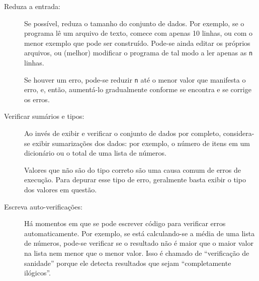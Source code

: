 \begin{description}

\item[Reduza a entrada:] Se possível, reduza o tamanho do conjunto de dados.
Por exemplo, se o programa lê um arquivo de texto, comece com apenas 10 linhas,
ou com o menor exemplo que pode ser construído. Pode-se ainda editar os próprios arquivos, ou (melhor) modificar o programa de tal modo a ler apenas as {\tt n} linhas.

Se houver um erro, pode-se reduzir {\tt n} até o menor valor que manifesta o erro, e, então, aumentá-lo gradualmente conforme se encontra e se corrige os erros.

\item[Verificar sumários e tipos:] Ao invés de exibir e verificar o conjunto de dados por completo, considera-se exibir sumarizações dos dados: por exemplo, o número de itens em um dicionário ou o total de uma lista de números.

Valores que não são do tipo correto são uma causa comum de erros de execução.
Para depurar esse tipo de erro, geralmente basta exibir o tipo dos valores em questão.

\item[Escreva auto-verificações:] Há momentos em que se pode escrever código para verificar erros automaticamente. Por exemplo, se está calculando-se a média de uma lista de números, pode-se verificar se o resultado não é maior que o maior valor na lista nem menor que o menor valor. Isso é chamado de ``verificação de sanidade'' porque ele detecta resultados que sejam ``completamente ilógicos''.


\end{description}
